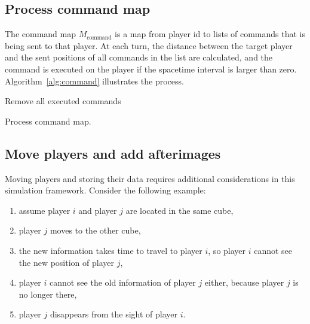 \documentclass{svproc}
\begin{document}
\subsection{Process command map} \label{ssec:command}

The command map $M_{\textrm{command}}$ is a map from player id to lists of commands that is being sent to that player.
At each turn, the distance between the target player and the sent positions of all commands in the list are calculated,
and the command is executed on the player if the spacetime interval is larger than zero.
Algorithm~\ref{alg:command} illustrates the process.

\begin{algorithm}

Remove all executed commands\;

\caption{Process command map.}
\label{alg:command}
\end{algorithm}

\subsection{Move players and add afterimages} \label{ssec:move}

Moving players and storing their data requires additional considerations in this simulation framework.
Consider the following example:
\begin{enumerate}
  \item assume player $i$ and player $j$ are located in the same cube,
  \item player $j$ moves to the other cube,
  \item the new information takes time to travel to player $i$, so player $i$ cannot see the new position of player $j$,
  \item player $i$ cannot see the old information of player $j$ either, because player $j$ is no longer there,
  \item player $j$ disappears from the sight of player $i$.
\end{enumerate}
\end{document}
